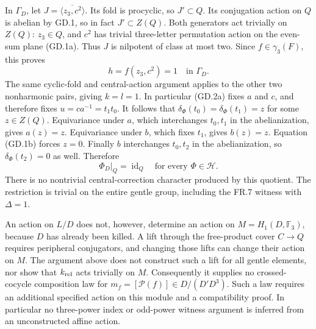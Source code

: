 In $\Gamma_D$, let $J=\overline{\langle z_3,c^2\rangle}$.
Its fold is procyclic, so $J'\subset Q$.
Its conjugation action on $Q$ is abelian
by GD.1, so in fact $J'\subset Z(Q)$.
Both generators act trivially on $Z(Q)$:
$z_3\in Q$, and $c^2$ has trivial
three-letter permutation action on the
even-sum plane (GD.1a). Thus $J$ is
nilpotent of class at most two. Since
$f\in\gamma_3(F)$, this proves
\[
                        h=f(z_3,c^2)=1
                         \quad\text{in }\Gamma_D.
\]
The same cyclic-fold and central-action
argument applies to the other two
nonharmonic pairs, giving $k=l=1$.
In particular (GD.2a) fixes $a$ and $c$,
and therefore fixes $u=ca^{-1}=t_1t_0$.
It follows that
$\delta_\Phi(t_0)=\delta_\Phi(t_1)=z$
for some $z\in Z(Q)$. Equivariance under
$a$, which interchanges $t_0,t_1$ in
the abelianization, gives $a(z)=z$.
Equivariance under $b$, which fixes
$t_1$, gives $b(z)=z$. Equation (GD.1b)
forces $z=0$. Finally $b$ interchanges
$t_0,t_2$ in the abelianization, so
$\delta_\Phi(t_2)=0$ as well. Therefore
\[
          \boxed{\ \Phi_D|_{Q}=\operatorname{id}_Q
                     \quad\text{for every }\Phi\in\mathcal H.\ }
 \tag{GD.3b}
\]
There is no nontrivial central-correction
character produced by this quotient.
The restriction is trivial on the entire
gentle group, including the FR.7 witness
with $\Delta=1$.

An action on $L/D$ does not, however, determine
an action on $M=H_1(D,\mathbb F_3)$, because
$D$ has already been killed. A lift through
the free-product cover $C\to Q$ requires
peripheral conjugators, and changing those
lifts can change their action on $M$.
The argument above does not construct such
a lift for all gentle elements, nor show
that $k_{\rm rel}$ acts trivially on $M$.
Consequently it supplies no crossed-cocycle
composition law for
$m_f=[\mathcal P(f)]\in D/(D'D^3)$.
Such a law requires an additional specified
action on this module and a compatibility
proof. In particular no three-power index
or odd-power witness argument is inferred
from an unconstructed affine action.
